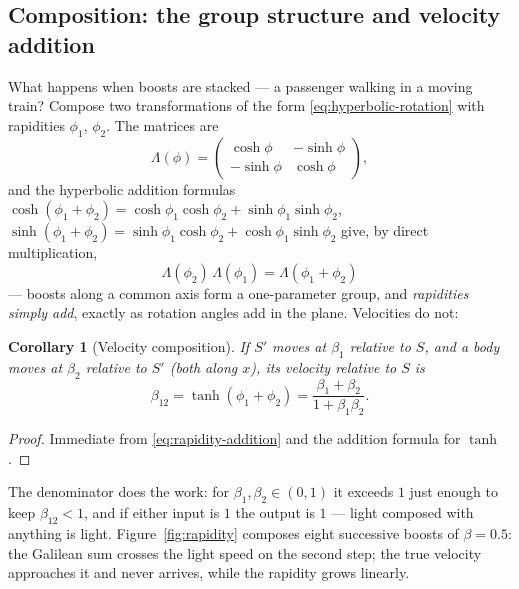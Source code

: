 \documentclass[11pt]{article}
\theoremstyle{plain}
\newtheorem{corollary}[theorem]{Corollary}
\theoremstyle{definition}
\theoremstyle{remark}
\begin{document}
\subsection{Composition: the group structure and velocity addition}
\label{sec:composition}

What happens when boosts are stacked --- a passenger walking in a moving
train? Compose two transformations of the form
\eqref{eq:hyperbolic-rotation} with rapidities $\phi_1$, $\phi_2$. The
matrices are
\begin{equation}
  \mathsf{\Lambda}(\phi) =
  \begin{pmatrix} \cosh\phi & -\sinh\phi \\ -\sinh\phi & \cosh\phi \end{pmatrix},
\end{equation}
and the hyperbolic addition formulas
$\cosh(\phi_1{+}\phi_2) = \cosh\phi_1\cosh\phi_2 + \sinh\phi_1\sinh\phi_2$,
$\sinh(\phi_1{+}\phi_2) = \sinh\phi_1\cosh\phi_2 + \cosh\phi_1\sinh\phi_2$
give, by direct multiplication,
\begin{equation}
  \boxed{\;
  \mathsf{\Lambda}(\phi_2)\,\mathsf{\Lambda}(\phi_1)
  = \mathsf{\Lambda}(\phi_1 + \phi_2)
  \;}
  \label{eq:rapidity-addition}
\end{equation}
--- boosts along a common axis form a one-parameter group, and
\emph{rapidities simply add}, exactly as rotation angles add in the
plane. Velocities do not:

\begin{corollary}[Velocity composition]\label{cor:velocity-addition}
If $S'$ moves at $\beta_1$ relative to $S$, and a body moves at
$\beta_2$ relative to $S'$ (both along $x$), its velocity relative to
$S$ is
\begin{equation}
  \boxed{\;
  \beta_{12} = \tanh(\phi_1 + \phi_2)
  = \frac{\beta_1 + \beta_2}{1 + \beta_1\beta_2}.
  \;}
  \label{eq:velocity-addition}
\end{equation}
\end{corollary}

\begin{proof}
Immediate from \eqref{eq:rapidity-addition} and the addition formula for
$\tanh$.
\end{proof}

\noindent
The denominator does the work: for $\beta_1, \beta_2 \in (0,1)$ it
exceeds $1$ just enough to keep $\beta_{12} < 1$, and if either input is
$1$ the output is $1$ --- light composed with anything is light.
Figure~\ref{fig:rapidity} composes eight successive boosts of
$\beta = 0.5$: the Galilean sum crosses the light speed on the second
step; the true velocity approaches it and never arrives, while the
rapidity grows linearly.
\end{document}
